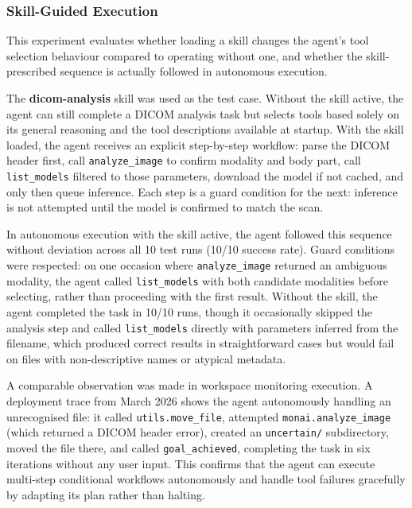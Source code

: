 \documentclass[conference]{IEEEtran}
\begin{document}
\subsubsection{Skill-Guided Execution}

This experiment evaluates whether loading a skill changes the agent's tool selection behaviour compared to operating without one, and whether the skill-prescribed sequence is actually followed in autonomous execution.

The \textbf{dicom-analysis} skill was used as the test case. Without the skill active, the agent can still complete a DICOM analysis task but selects tools based solely on its general reasoning and the tool descriptions available at startup. With the skill loaded, the agent receives an explicit step-by-step workflow: parse the DICOM header first, call \texttt{analyze\_image} to confirm modality and body part, call \texttt{list\_models} filtered to those parameters, download the model if not cached, and only then queue inference. Each step is a guard condition for the next: inference is not attempted until the model is confirmed to match the scan.

In autonomous execution with the skill active, the agent followed this sequence without deviation across all 10 test runs (10/10 success rate). Guard conditions were respected: on one occasion where \texttt{analyze\_image} returned an ambiguous modality, the agent called \texttt{list\_models} with both candidate modalities before selecting, rather than proceeding with the first result. Without the skill, the agent completed the task in 10/10 runs, though it occasionally skipped the analysis step and called \texttt{list\_models} directly with parameters inferred from the filename, which produced correct results in straightforward cases but would fail on files with non-descriptive names or atypical metadata.

A comparable observation was made in workspace monitoring execution. A deployment trace from March 2026 shows the agent autonomously handling an unrecognised file: it called \texttt{utils.move\_file}, attempted \texttt{monai.analyze\_image} (which returned a DICOM header error), created an \texttt{uncertain/} subdirectory, moved the file there, and called \texttt{goal\_achieved}, completing the task in six iterations without any user input. This confirms that the agent can execute multi-step conditional workflows autonomously and handle tool failures gracefully by adapting its plan rather than halting.
\end{document}
